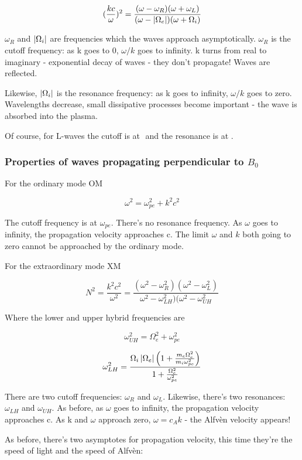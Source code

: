 \documentclass[PlasmaNotes.tex]{subfiles}
\begin{document}
\[(\frac{k c}{\omega})^2 = \frac{(\omega-\omega_R)(\omega+\omega_L)}{(\omega-\left| \Omega_e \right|)(\omega+\Omega_i)} \]

$\omega_R$ and $\left| \Omega_i \right|$ are frequencies which the waves approach asymptotically. $\omega_R$ is the cutoff frequency: as k goes to 0, $\omega/k$ goes to infinity. k turns from real to imaginary - exponential decay of waves - they don't propagate! Waves are reflected.

Likewise, $\left| \Omega_i \right|$ is the resonance frequency: as k goes to infinity, $\omega/k$ goes to zero. Wavelengths decrease, small dissipative processes become important - the wave is absorbed into the plasma.

Of course, for L-waves the cutoff is at $ $ and the resonance is at $ $.



\subsubsection{Properties of waves propagating perpendicular to $B_0$}

For the ordinary mode OM

\[ \omega^2 = \omega_{pe}^2 + k^2 c^2 \]

The cutoff frequency is at $\omega_{pe}$. There's no resonance frequency. As $\omega$ goes to infinity, the propagation velocity approaches c. The limit $\omega$ and $k$ both going to zero cannot be approached by the ordinary mode.

For the extraordinary mode XM

\[ N^2 = \frac{k^2c^2}{\omega^2} = \frac{(\omega^2-\omega_R^2)(\omega^2-\omega_L^2)}{\omega^2-\omega_{LH}^2)(\omega^2-\omega_{UH}^2} \]

Where the lower and upper hybrid frequencies are

\[ \omega^2_{UH} = \Omega_e^2 + \omega_{pe}^2 \]

\[ \omega^2_{LH} = \frac{\Omega_i \left| \Omega_e \right| \Big(1+\frac{m_e \Omega_e^2}{m_i\omega_{pe}^2}\Big)}{1+\frac{\Omega_e^2}{\omega_{pe}^2}} \]

There are two cutoff frequencies: $\omega_R$ and $\omega_L$. Likewise, there's two resonances: $\omega_{LH}$ and $\omega_{UH}$. As before, as $\omega$ goes to infinity, the propagation velocity approaches c. As k and $\omega$ approach zero, $\omega = c_A k$ - the Alfvèn velocity appears!

As before, there's two asymptotes for propagation velocity, this time they're the speed of light and the speed of Alfvèn:
\end{document}
